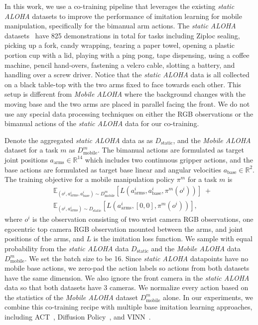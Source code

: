 \documentclass[11pt, a4paper, logo, twocolumn]{stanford}
\newcommand{\method}{\textit{Mobile ALOHA} }
\newcommand{\staticaloha}{\textit{static ALOHA} }
\begin{document}
In this work, we use a co-training pipeline
that leverages the existing \staticaloha datasets to improve the performance of imitation learning for mobile manipulation, specifically for the bimanual arm actions. The \staticaloha datasets~\cite{zhao2023learning,shi2023waypoint}
have 825 demonstrations in total for tasks including Ziploc sealing, picking up a fork, candy wrapping, tearing a paper towel, opening a plastic portion cup with a lid, playing with a ping pong, 
tape dispensing, using a coffee machine, pencil hand-overs, fastening a velcro cable, slotting a battery, and handling over a screw driver. Notice that the \staticaloha data is all 
collected on a black table-top with the two arms fixed to face towards each other. This setup is different from \method 
where the background changes with the moving base and the two arms are placed in parallel facing the front. We do not use any special data processing techniques on either the RGB observations or the bimanual actions of the \staticaloha data for our co-training. 

Denote the aggregated \staticaloha data as
as $D_{\text{static}}$, and the \method dataset for a task $m$ as $D_{\text{mobile}}^m$. The bimanual actions are formulated as target joint positions $a_{\text{arms}} \in \mathbb{R}^{14}$ which includes 
two continuous gripper actions, and the base actions are formulated as target base linear and angular velocities $a_{\text{base}} \in \mathbb{R}^{2}$. The training objective for a mobile manipulation policy $\pi^{m}$ for a task $m$ is
\begin{align*}
    & \mathbb{E}_{ (o^i, a_{\text{arms}}^i, a_{\text{base}}^i) \sim D_{\text{mobile}}^m} \left[ L(a_{\text{arms}}^i, a_{\text{base}}^i, \pi^m(o^i)) \right] \; + \\
    & \mathbb{E}_{ (o^i, a_{\text{arms}}^i) \sim D_{\text{static}}} \left[ L(a_{\text{arms}}^i, [0, 0], \pi^m(o^i))  \right], 
\end{align*}
where $o^i$ is the observation consisting of two wrist camera RGB observations, one egocentric top camera RGB
observation mounted between the arms, and joint positions of the arms,
and $L$ is the imitation loss function. We sample with equal probability from the \staticaloha data $D_{\text{static}}$ and the \method data $D_{\text{mobile}}^m$. We set the batch size to be 16. 
Since \staticaloha datapoints have no mobile base actions, we zero-pad the action labels so actions from both datasets have the same dimension.
We also ignore the front camera in the \staticaloha data so that both datasets have 3 cameras.
We normalize 
every action based on the statistics of the \method dataset $D_{\text{mobile}}^m$ alone. In our experiments, we combine this co-training recipe with multiple base imitation learning approaches, including ACT~\cite{zhao2023learning}, Diffusion Policy~\cite{chi2023diffusionpolicy}, and VINN~\cite{pari2021surprising}. 
\end{document}
